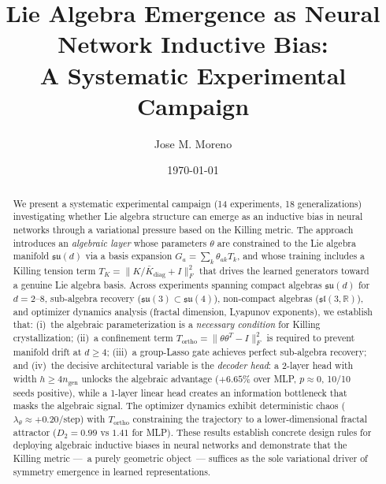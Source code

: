 \documentclass[11pt,a4paper]{article}
\title{%
  Lie Algebra Emergence as Neural Network Inductive Bias:\\
  A Systematic Experimental Campaign%
}
\author{Jose M. Moreno}
\affil{Independent Researcher}
\date{\today}
\newcommand{\fksu}{\mathfrak{su}}
\newcommand{\fksl}{\mathfrak{sl}}
\newcommand{\RR}{\mathbb{R}}
\newcommand{\TK}{T_K}
\newcommand{\Tortho}{T_{\mathrm{ortho}}}
\newcommand{\ngen}{n_{\mathrm{gen}}}
\theoremstyle{definition}
\begin{document}
\maketitle

\begin{abstract}
We present a systematic experimental campaign (14 experiments, 18 generalizations) 
investigating whether Lie algebra structure can emerge as an inductive bias in neural 
networks through a variational pressure based on the Killing metric. The approach 
introduces an \emph{algebraic layer} whose parameters $\theta$ are constrained to the 
Lie algebra manifold $\fksu(d)$ via a basis expansion $G_a = \sum_k \theta_{ak} T_k$, 
and whose training includes a Killing tension term 
$\TK = \|K/\bar{K}_{\mathrm{diag}} + I\|_F^2$ that drives the learned generators 
toward a genuine Lie algebra basis. Across experiments spanning compact algebras 
$\fksu(d)$ for $d = 2$--$8$, sub-algebra recovery ($\fksu(3) \subset \fksu(4)$), 
non-compact algebras ($\fksl(3,\RR)$), and optimizer dynamics analysis 
(fractal dimension, Lyapunov exponents), we establish that: 
(i)~the algebraic parameterization is a \emph{necessary condition} for Killing 
crystallization; 
(ii)~a confinement term $\Tortho = \|\theta\theta^T - I\|_F^2$ is required to 
prevent manifold drift at $d \geq 4$; 
(iii)~a group-Lasso gate achieves perfect sub-algebra recovery; and 
(iv)~the decisive architectural variable is the \emph{decoder head}: a 2-layer 
head with width $h \geq 4\ngen$ unlocks the algebraic advantage 
($+6.65\%$ over MLP, $p \approx 0$, 10/10 seeds positive), while a 1-layer 
linear head creates an information bottleneck that masks the algebraic signal. 
The optimizer dynamics exhibit deterministic chaos 
($\lambda_\theta \approx +0.20$/step) with $\Tortho$ constraining the 
trajectory to a lower-dimensional fractal attractor ($D_2 = 0.99$ vs $1.41$ 
for MLP). These results establish concrete design rules for deploying algebraic 
inductive biases in neural networks and demonstrate that the Killing metric 
---~a purely geometric object~--- suffices as the sole variational driver of 
symmetry emergence in learned representations.
\end{abstract}

\tableofcontents

\end{document}
